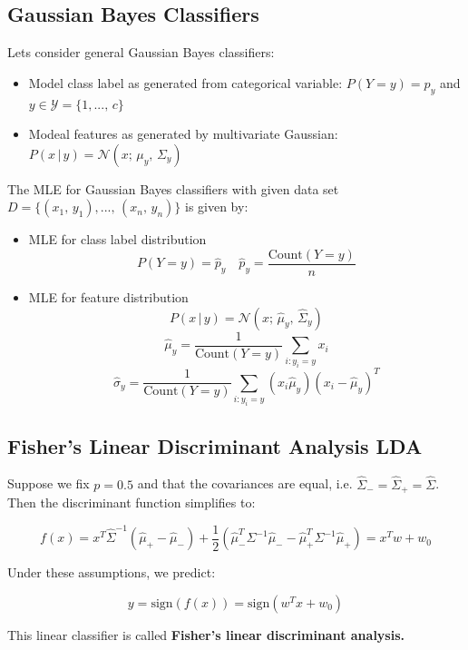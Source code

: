 \documentclass[a4paper]{extarticle}
\begin{document}
\subsection{Gaussian Bayes Classifiers}

Lets consider general Gaussian Bayes classifiers:
\begin{itemize}
    \item Model class label as generated from categorical variable: $P(Y = y) = p_y$ and $y \in \mathcal{Y} = \{1,..., \, c\}$
    \item Modeal features as generated by multivariate Gaussian: $P(x \, | \, y) = \mathcal{N}(x; \, \mu_y, \, \Sigma_y)$
\end{itemize}

The MLE for Gaussian Bayes classifiers with given data set $D = \{(x_1, \, y_1),..., \, (x_n, \, y_n)\}$ is given by:
\begin{itemize}
    \item MLE for class label distribution
    \[
        P(Y = y) = \hat{p}_y \quad \hat{p}_y = \frac{\text{Count}(Y = y)}{n}
    \]
    \item MLE for feature distribution
    \[
        P(x \, | \, y) = \mathcal{N}(x; \, \hat{\mu}_y, \, \hat{\Sigma}_y)
    \]
    \[
        \hat{\mu}_y = \frac{1}{\text{Count}(Y = y)} \sum_{i:y_i=y} x_i
    \]
    \[
        \hat{\sigma}_y = \frac{1}{\text{Count}(Y = y)} \sum_{i:y_i=y}(x_i \hat{\mu}_y)(x_i - \hat{\mu}_y)^T
    \]
\end{itemize}

\subsection{Fisher's Linear Discriminant Analysis LDA}

Suppose we fix $p = 0.5$ and that the covariances are equal, i.e. $\hat{\Sigma}_- = \hat{\Sigma}_+ = \hat{\Sigma}$. Then the discriminant function simplifies to:

\[
    f(x) = x^T\hat{\Sigma}^{-1}(\hat{\mu}_+ - \hat{\mu}_-) + \frac{1}{2}(\hat{\mu}_-^T \Sigma^{-1}\hat{\mu}_- - \hat{\mu}_+^T \Sigma^{-1}\hat{\mu}_+) = x^Tw + w_0
\]

Under these assumptions, we predict:

\[
    y = \text{sign}(f(x)) = \text{sign}(w^Tx + w_0)
\]

This linear classifier is called \textbf{Fisher's linear discriminant analysis.}
\end{document}
